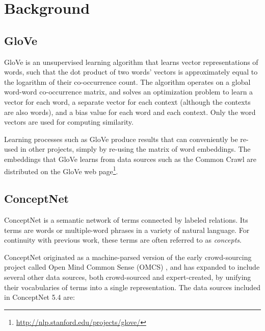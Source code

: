 \documentclass[11pt]{article}
\begin{document}
\section{Background}

\subsection{GloVe}

GloVe \cite{pennington2014glove} is an unsupervised learning algorithm that
learns vector representations of words, such that the dot product of two words'
vectors is approximately equal to the logarithm of their co-occurrence count.
The algorithm operates on a global word-word co-occurrence matrix, and
solves an optimization problem to learn a vector for each word, a separate
vector for each context (although the contexts are also words), and a bias
value for each word and each context. Only the word vectors are used for
computing similarity.

Learning processes such as GloVe produce results that can conveniently be
re-used in other projects, simply by re-using the matrix of word embeddings.
The embeddings that GloVe learns from data sources such as the Common Crawl are
distributed on the GloVe web
page\footnote{\url{http://nlp.stanford.edu/projects/glove/}}.

\subsection{ConceptNet}
ConceptNet \cite{speer2012conceptnet} is a semantic network of terms
connected by labeled relations. Its terms are words or multiple-word phrases
in a variety of natural language. For continuity with previous work,
these terms are often referred to as {\em concepts}.

ConceptNet originated as a machine-parsed version of the early crowd-sourcing
project called Open Mind Common Sense (OMCS) \cite{singh2002omcs}, and has expanded
to include several other data sources, both crowd-sourced and expert-created,
by unifying their vocabularies of terms into a single representation.
The data sources included in ConceptNet 5.4 are:
\end{document}

